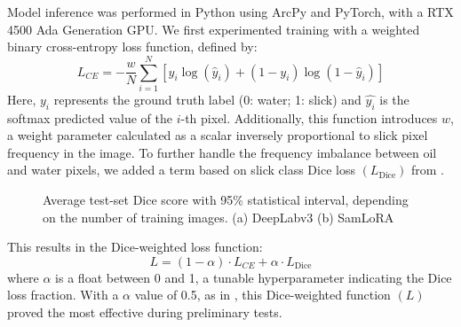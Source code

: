 \documentclass[journal]{IEEEtran}
\begin{document}
Model inference was performed in Python using ArcPy and PyTorch, with a RTX 4500 Ada Generation GPU.
We first experimented training with a weighted binary cross-entropy loss function, defined by:
\begin{equation}
    L_\textit{CE} = -\frac{w}{N} \sum_{i=1}^{N} \left[ y_i \log(\hat{y}_i) + (1 - y_i) \log(1 - \hat{y}_i) \right]
\end{equation}
Here, \( y_i \) represents the ground truth label (0: water; 1: slick) and \( \hat{y_i}  \) is the softmax predicted value of the \( i \)-th pixel. Additionally, this function introduces \( w \), a weight parameter
calculated as a scalar inversely proportional to slick pixel frequency in the image\cite{azadLossFunctionsEra2023}. To further handle the frequency imbalance between oil and water pixels, 
we added a term based on slick class Dice loss \( (L_\text{Dice}) \) from \cite{milletariVNetFullyConvolutional2016}.
\begin{figure}[!t]
    \centering
    \hfil
    \caption{Average test-set Dice score with 95\% statistical interval, depending on the number of training images. \quad (a) DeepLabv3 \quad (b) SamLoRA }
    \label{figure2}
\end{figure}
This results in the Dice-weighted loss function:
\begin{equation}
    L = (1 - \alpha) \cdot L_\textit{CE} + \alpha \cdot L_\text{Dice}
\end{equation}
where $\alpha$ is a float between 0 and 1, a tunable hyperparameter indicating the Dice loss fraction. With a $\alpha$ value of 0.5, as in \cite{taghanakiComboLossHandling2019}, 
this Dice-weighted function \( (L) \) proved the most effective during preliminary tests.
\end{document}
